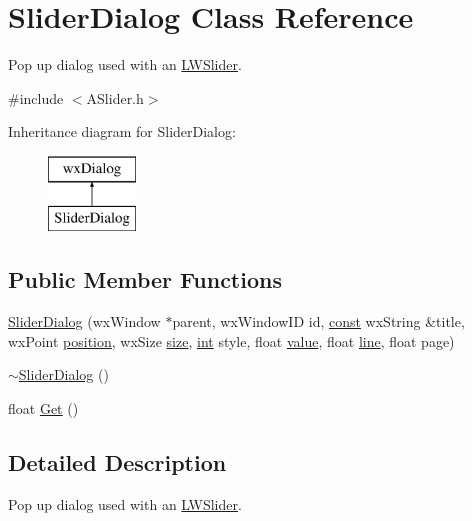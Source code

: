\hypertarget{class_slider_dialog}{}\section{Slider\+Dialog Class Reference}
\label{class_slider_dialog}


Pop up dialog used with an \hyperlink{class_l_w_slider}{L\+W\+Slider}.  




{\ttfamily \#include $<$A\+Slider.\+h$>$}

Inheritance diagram for Slider\+Dialog\+:\begin{figure}[H]
\begin{center}
\leavevmode
\includegraphics[height=2.000000cm]{class_slider_dialog}
\end{center}
\end{figure}
\subsection*{Public Member Functions}
\begin{DoxyCompactItemize}
\item 
\hyperlink{class_slider_dialog_aab436135ffed8ead9a8c2d039b4248dd}{Slider\+Dialog} (wx\+Window $\ast$parent, wx\+Window\+ID id, \hyperlink{getopt1_8c_a2c212835823e3c54a8ab6d95c652660e}{const} wx\+String \&title, wx\+Point \hyperlink{structposition}{position}, wx\+Size \hyperlink{group__lavu__mem_ga854352f53b148adc24983a58a1866d66}{size}, \hyperlink{xmltok_8h_a5a0d4a5641ce434f1d23533f2b2e6653}{int} style, float \hyperlink{lib_2expat_8h_a4a30a13b813682e68c5b689b45c65971}{value}, float \hyperlink{seqread_8c_aad9ebcdde542d8b2075615388ff15a9c}{line}, float page)
\item 
\hyperlink{class_slider_dialog_adbeb2042cdd167c47317374da01e95af}{$\sim$\+Slider\+Dialog} ()
\item 
float \hyperlink{class_slider_dialog_a7db9d85a95a587cb7f7cb9fe9d5ff49e}{Get} ()
\end{DoxyCompactItemize}


\subsection{Detailed Description}
Pop up dialog used with an \hyperlink{class_l_w_slider}{L\+W\+Slider}. 

